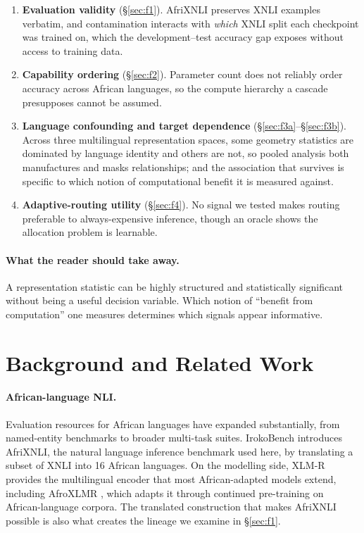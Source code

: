 \documentclass[11pt]{article}
\newcommand{\claim}[1]{#1}   %
\begin{document}
\begin{enumerate}
  \item \textbf{Evaluation validity} (\S\ref{sec:f1}). AfriXNLI preserves XNLI
        examples verbatim, and contamination interacts with \emph{which} XNLI
        split each checkpoint was trained on, which the development--test
        accuracy gap exposes without access to training data.
  \item \textbf{Capability ordering} (\S\ref{sec:f2}). Parameter count does not
        reliably order accuracy across African languages, so the compute
        hierarchy a cascade presupposes cannot be assumed.
  \item \textbf{Language confounding and target dependence}
        (\S\ref{sec:f3a}--\S\ref{sec:f3b}). Across three multilingual
        representation spaces, some geometry statistics are dominated by language
        identity and others are not, so pooled analysis both manufactures and
        masks relationships; and the association that survives is specific to
        which notion of computational benefit it is measured against.
  \item \textbf{Adaptive-routing utility} (\S\ref{sec:f4}). No signal we tested
        makes routing preferable to always-expensive inference, though an oracle
        shows the allocation problem is learnable.
\end{enumerate}

\paragraph{What the reader should take away.}
\claim{A representation statistic can be highly structured and statistically
significant without being a useful decision variable.} \claim{Which notion of
``benefit from computation'' one measures determines which signals appear
informative.}

\section{Background and Related Work}
\label{sec:related}

\paragraph{African-language NLI.} Evaluation resources for African languages have
expanded substantially, from named-entity benchmarks
\citep{adelani-etal-2021-masakhaner} to broader multi-task suites. IrokoBench
\citep{adelani-etal-2025-irokobench} introduces AfriXNLI, the natural language inference
benchmark used here, by translating a subset of XNLI
\citep{conneau-etal-2018-xnli} into 16 African languages. On the modelling side,
XLM-R \citep{conneau-etal-2020-unsupervised} provides the multilingual encoder that most
African-adapted models extend, including AfroXLMR
\citep{alabi-etal-2022-adapting}, which adapts it through continued pre-training on
African-language corpora. The translated construction that makes AfriXNLI
possible is also what creates the lineage we examine in \S\ref{sec:f1}.
\end{document}
